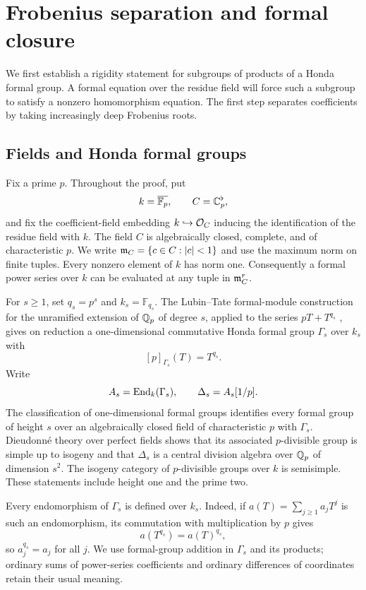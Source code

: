 \section{Frobenius separation and formal closure}\label{sec:formal}

We first establish a rigidity statement for subgroups of products of a Honda
formal group. A formal equation over the residue field will force such a
subgroup to satisfy a nonzero homomorphism equation. The first step separates
coefficients by taking increasingly deep Frobenius roots.

\subsection{Fields and Honda formal groups}

Fix a prime $p$. Throughout the proof, put
\[
  k=\overline{\mathbb F_p},\qquad C=\mathbb C_p^{\flat},
\]
and fix the coefficient-field embedding $k\hookrightarrow\mathcal O_C$ inducing
the identification of the residue field with $k$. The field $C$ is
algebraically closed, complete, and of characteristic $p$. We write
$\mathfrak m_C=\{c\in C:|c|<1\}$ and use the maximum norm on finite tuples.
Every nonzero element of $k$ has norm one. Consequently a formal power
series over $k$ can be evaluated at any tuple in $\mathfrak m_C^r$.

For $s\geq 1$, set $q_s=p^s$ and $k_s=\mathbb F_{q_s}$. The Lubin--Tate formal-module construction for the unramified extension
of $\mathbb Q_p$ of degree $s$, applied to the series $pT+T^{q_s}$
\cite[Theorem~1]{LT65}, gives on reduction a one-dimensional
commutative Honda formal group $\Gamma_s$ over $k_s$ with
\[
  [p]_{\Gamma_s}(T)=T^{q_s}.
\]
Write
\[
  A_s=\operatorname{End}_k(\Gamma_s),\qquad \Delta_s=A_s[1/p].
\]
The classification of one-dimensional formal groups
\cite[Theorem~18.5.1]{Hazewinkel78} identifies every formal group of
height $s$ over an algebraically closed field of characteristic $p$
with $\Gamma_s$. Dieudonn\'e theory over perfect fields
\cite[Chapter~III, \S8; Chapter~IV, \S\S1,3--4]{Demazure72}
shows that its associated $p$-divisible group is simple up to isogeny
and that $\Delta_s$ is a central division algebra over $\mathbb Q_p$ of
dimension $s^2$. The isogeny category of $p$-divisible groups over $k$
is semisimple.
These statements include height one and the prime two.

Every endomorphism of $\Gamma_s$ is defined over $k_s$. Indeed, if
$a(T)=\sum_{j\geq1}a_jT^j$ is such an endomorphism, its commutation
with multiplication by $p$ gives
\[
  a(T^{q_s})=a(T)^{q_s},
\]
so $a_j^{q_s}=a_j$ for all $j$. We use formal-group addition in
$\Gamma_s$ and its products; ordinary sums of power-series coefficients
and ordinary differences of coordinates retain their usual meaning.

